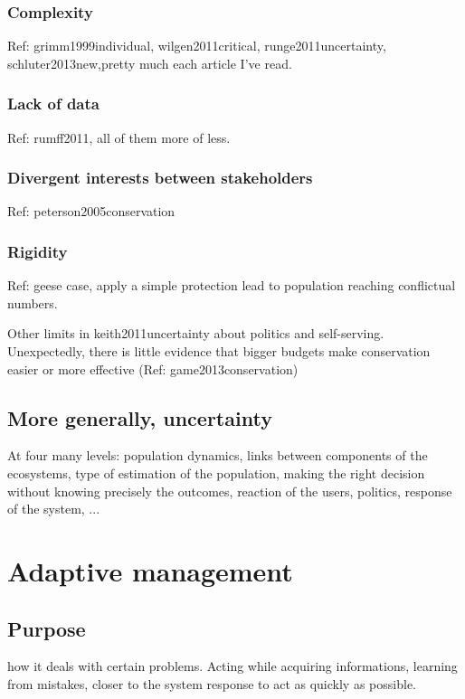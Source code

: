 \documentclass[12pt,a4paper]{article}
\begin{document}
\subsubsection{Complexity}
Ref: grimm1999individual, wilgen2011critical, runge2011uncertainty, schluter2013new,pretty much each article I've read.

\subsubsection{Lack of data}
Ref: rumff2011, all of them more of less.

\subsubsection{Divergent interests between stakeholders}
Ref: peterson2005conservation

\subsubsection{Rigidity}
Ref: geese case, apply a simple protection lead to population reaching conflictual numbers.

Other limits in keith2011uncertainty about politics and self-serving.
Unexpectedly, there is little  evidence that bigger budgets make conservation easier or more effective (Ref: game2013conservation)

\subsection{More generally, uncertainty}
At four many levels: population dynamics, links between components of the ecosystems, type of estimation of the population, making the right decision without knowing precisely the outcomes, reaction of the users, politics, response of the system, ...

\section{Adaptive management}

\subsection{Purpose}

how it deals with certain problems. Acting while acquiring informations, learning from mistakes, closer to the system response to act as quickly as possible.
\end{document}
